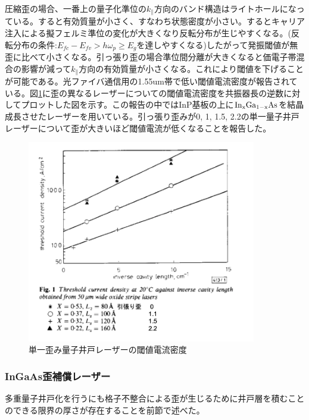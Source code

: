 
圧縮歪の場合、一番上の量子化準位の$k_{\|}$方向のバンド構造はライトホールになっている。すると有効質量が小さく、すなわち状態密度が小さい。するとキャリア注入による擬フェルミ準位の変化が大きくなり反転分布が生じやすくなる。(反転分布の条件:$E_{fc}-E_{fv}>h\omega _{p}\geq E_{g}$を達しやすくなる)したがって発振閾値が無歪に比べて小さくなる。引っ張り歪の場合準位間分離が大きくなると価電子帯混合の影響が減って$k_{\|}$方向の有効質量が小さくなる。これにより閾値を下げることが可能である。光ファイバ通信用の1.55um帯で低い閾値電流密度が報告されている\cite{ref_thijs}。図\ref{fig:fig_lattice_strain_Ith}に歪の異なるレーザーについての閾値電流密度を共振器長の逆数に対してプロットした図を示す。この報告の中ではInP基板の上に$\rm{In_{x}Ga_{1-x}As}$を結晶成長させたレーザーを用いている。引っ張り歪みが0, 1, 1.5, 2.2の単一量子井戸レーザーについて歪が大きいほど閾値電流が低くなることを報告した。
\begin{figure}[h]
	\centering
	\includegraphics[width=10cm]{figure/fig_1_1_lattice_strain_Ith.png}
	\caption{単一歪み量子井戸レーザーの閾値電流密度\cite{ref_thijs}}
	\label{fig:fig_lattice_strain_Ith}
\end{figure}

\clearpage
\subsubsection{InGaAs歪補償レーザー}
多重量子井戸化を行うにも格子不整合による歪が生じるために井戸層を積むことのできる限界の厚さが存在することを前節で述べた。


